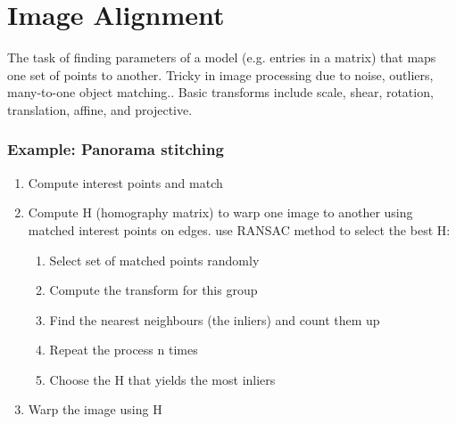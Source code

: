 \documentclass[]{article}
\begin{document}
\section{Image Alignment}
	\textnormal{The task of finding parameters of a model (e.g. entries in a matrix) that maps one set of points to another. Tricky in image processing due to noise, outliers, many-to-one object matching.. Basic transforms include scale, shear, rotation, translation, affine, and projective.}
	
	\subsubsection{Example: Panorama stitching} 
	\begin{enumerate}
		\item Compute interest points and match
		\item Compute H (homography matrix) to warp one image to another using matched interest points on edges. use RANSAC method to select the best H:
		\begin{enumerate}
			\item Select set of matched points randomly
			\item Compute the transform for this group
			\item Find the nearest neighbours (the inliers) and count them up
			\item Repeat the process n times
			\item Choose the H that yields the most inliers
		\end{enumerate}
		\item Warp the image using H
	\end{enumerate}
\end{document}
